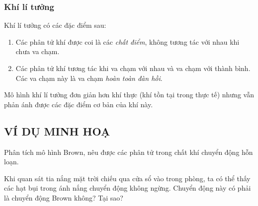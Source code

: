 \subsubsection{Khí lí tưởng}
\begin{boxdn}
	Khí lí tưởng có các đặc điểm sau:
	\begin{enumerate}[label=\arabic*.]
		\item Các phân tử khí được coi là các \textit{chất điểm}, không tương tác với nhau khi chưa va chạm.
		\item Các phân tử khí tương tác khi va chạm với nhau và va chạm với thành bình. Các va chạm này là va chạm \textit{hoàn toàn đàn hồi}.
	\end{enumerate}
\end{boxdn}
\begin{luuy}
	Mô hình khí lí tưởng đơn giản hơn khí thực (khí tồn tại trong thực tế) nhưng vẫn phản ánh được các đặc điểm cơ bản của khí này.
\end{luuy}
\subsection{VÍ DỤ MINH HOẠ}
\begin{dang}{Phân tích mô hình Brown, nêu được các phân tử trong chất khí chuyển động hỗn loạn.}
	\end{dang}
	\begin{vd}
Khi quan sát tia nắng mặt trời chiếu qua cửa sổ vào trong phòng, ta có thể thấy các hạt bụi trong ánh nắng chuyển động không ngừng. Chuyển động này có phải là chuyển động Brown không? Tại sao?
	\end{vd}

